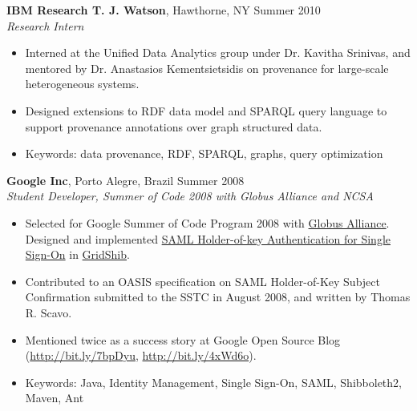 \documentclass[line,margin]{res}
\begin{document}
\begin{resume}
                \textbf{IBM Research T. J. Watson}, Hawthorne, NY \hfill Summer 2010 \\
                {\sl Research Intern}
                \begin{itemize}  \itemsep -2pt
                \item Interned at the Unified Data Analytics group under Dr. Kavitha Srinivas, and mentored 
                by Dr. Anastasios Kementsietsidis on provenance for large-scale heterogeneous systems.
                \item Designed extensions to RDF data model and SPARQL query language to support 
                provenance annotations over graph structured data.
                \item Keywords: data provenance, RDF, SPARQL, graphs, query optimization
                \end{itemize} 
                                
                \textbf{Google Inc}, Porto Alegre, Brazil \hfill Summer 2008\\
                {\sl Student Developer, Summer of Code 2008 with Globus Alliance and NCSA}
                \begin{itemize}  \itemsep -2pt
                \item Selected for Google Summer of Code Program 2008 with 
                \href{http://www.globus.org}{Globus Alliance}. Designed and implemented
                \href{https://web.archive.org/web/20150405141413/https://dev.globus.org/wiki/GSoC08/SAML_Holder_of_Key_Authn_for_HTTP_SSO}{SAML Holder-of-key Authentication for Single Sign-On}
                in \href{http://gridshib.globus.org/}{GridShib}.
                \item Contributed to an OASIS specification on SAML Holder-of-Key Subject Confirmation 
                submitted to the SSTC in August 2008, and written by Thomas R. Scavo.
                \item Mentioned twice as a success story at Google Open Source Blog
                (\url{http://bit.ly/7bpDyu}, \url{http://bit.ly/4xWd6o}).
                \item Keywords: Java, Identity Management, Single Sign-On, SAML, Shibboleth2, Maven, Ant
                \end{itemize}                
                

\end{resume}
\end{document}
